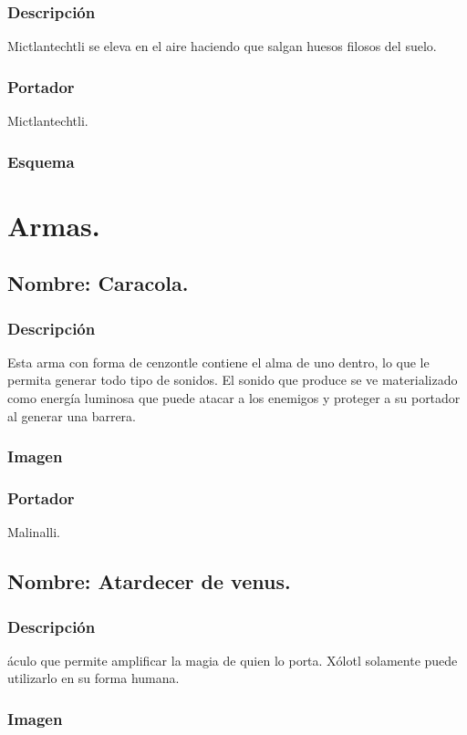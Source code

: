 \documentclass[11pt,letterpaper]{article}
\begin{document}
\subsubsection{Descripción}
Mictlantechtli se eleva en el aire haciendo que salgan huesos filosos del suelo.
\subsubsection{Portador}
Mictlantechtli.
\subsubsection{Esquema}


\section{Armas.}
\subsection{Nombre: Caracola.}
\subsubsection{Descripción}
Esta arma con forma de cenzontle contiene el alma de uno dentro, lo que le permita generar todo tipo de sonidos. El sonido que produce se ve materializado como energía luminosa que puede atacar a los enemigos y proteger a su portador al generar una barrera.
\subsubsection{Imagen}
\subsubsection{Portador}
Malinalli.

\subsection{Nombre: Atardecer de venus.}
\subsubsection{Descripción}
áculo que permite amplificar la magia de quien lo porta. Xólotl solamente puede utilizarlo en su forma humana.
\subsubsection{Imagen}
\end{document}
